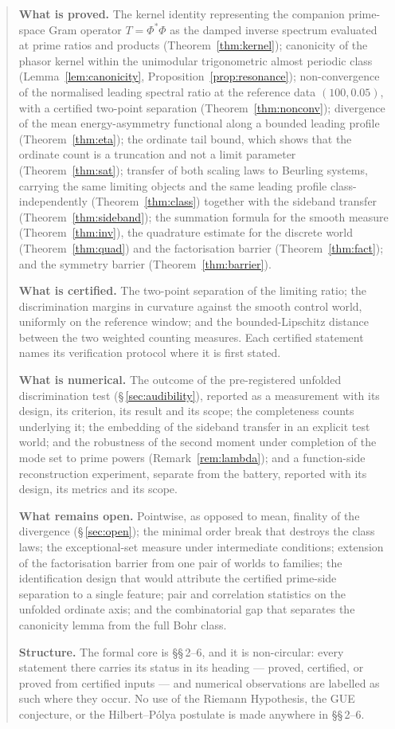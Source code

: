 \documentclass[11pt]{article}
\begin{document}
\begin{abstract}
\textbf{What is proved.}
The kernel identity representing the companion prime-space Gram operator
$T=\Phi^{*}\Phi$ as the damped inverse spectrum evaluated at prime ratios
and products (Theorem~\ref{thm:kernel});
canonicity of the phasor kernel within the unimodular trigonometric almost
periodic class (Lemma~\ref{lem:canonicity},
Proposition~\ref{prop:resonance});
non-convergence of the normalised leading spectral ratio at the reference
data $(100,0.05)$, with a certified two-point separation
(Theorem~\ref{thm:nonconv});
divergence of the mean energy-asymmetry functional along a bounded leading profile
(Theorem~\ref{thm:eta});
the ordinate tail bound, which shows that the ordinate count is a truncation
and not a limit parameter (Theorem~\ref{thm:sat});
transfer of both scaling laws to Beurling systems, carrying the same
limiting objects and the same leading profile class-independently
(Theorem~\ref{thm:class}) together with the sideband transfer
(Theorem~\ref{thm:sideband});
the summation formula for the smooth measure (Theorem~\ref{thm:inv}), the
quadrature estimate for the discrete world (Theorem~\ref{thm:quad}) and the
factorisation barrier (Theorem~\ref{thm:fact});
and the symmetry barrier (Theorem~\ref{thm:barrier}).

\textbf{What is certified.}
The two-point separation of the limiting ratio; the discrimination margins in
curvature against the smooth control world, uniformly on the reference window;
and the bounded-Lipschitz distance between the two weighted counting measures.
Each certified statement names its verification protocol where it is first
stated.

\textbf{What is numerical.}
The outcome of the pre-registered unfolded discrimination test
(\S\,\ref{sec:audibility}), reported as a measurement with its design, its
criterion, its result and its scope; the completeness counts underlying it;
the embedding of the sideband transfer in an explicit test world; and the
robustness of the second moment under completion of the mode set to prime
powers (Remark~\ref{rem:lambda}); and a function-side reconstruction
experiment, separate from the battery, reported with its design, its
metrics and its scope.

\textbf{What remains open.}
Pointwise, as opposed to mean, finality of the divergence
(\S\,\ref{sec:open}); the minimal order break that destroys the class laws;
the exceptional-set measure under intermediate conditions; extension of the
factorisation barrier from one pair of worlds to families; the
identification design that would attribute the certified prime-side
separation to a single feature; pair and correlation statistics on the
unfolded ordinate axis; and the combinatorial gap that separates the
canonicity lemma from the full Bohr class.

\textbf{Structure.}
The formal core is \S\S\,2--6, and it is non-circular: every statement there
carries its status in its heading --- proved, certified, or proved from
certified inputs --- and numerical observations are labelled as such where
they occur. No use of the Riemann Hypothesis, the GUE conjecture, or the
Hilbert--P\'olya postulate is made anywhere in \S\S\,2--6.
\end{abstract}
\end{document}
